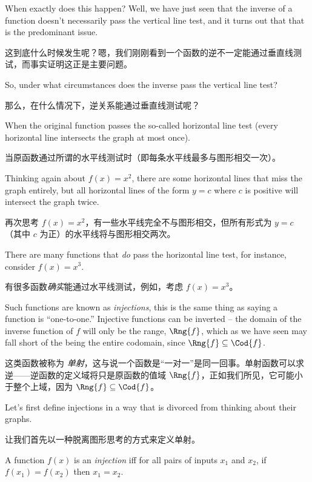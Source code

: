 When exactly does this happen?  Well, we have just seen that the inverse
of a function doesn't necessarily pass the vertical line test, and it turns
out that that is the predominant issue.

这到底什么时候发生呢？嗯，我们刚刚看到一个函数的逆不一定能通过垂直线测试，而事实证明这正是主要问题。

So, under what circumstances does
the inverse pass the vertical line test?

那么，在什么情况下，逆关系能通过垂直线测试呢？

When the original function 
passes the so-called horizontal line test (every horizontal line
intersects the graph at most once).

当原函数通过所谓的水平线测试时（即每条水平线最多与图形相交一次）。

Thinking again about $f(x)=x^2$, there
are some horizontal lines that miss the graph entirely, but all horizontal
lines of the form $y=c$ where $c$ is positive will intersect the graph twice.

再次思考 $f(x)=x^2$，有一些水平线完全不与图形相交，但所有形式为 $y=c$（其中 $c$ 为正）的水平线将与图形相交两次。

There are many functions that \emph{do} pass the horizontal line test, for 
instance, consider $f(x) = x^3$.

有很多函数\emph{确实}能通过水平线测试，例如，考虑 $f(x) = x^3$。

Such functions are known as 
\emph{injections}, this is the same thing as 
saying a function is ``one-to-one.''   Injective functions can be inverted --
the domain of the inverse function of $f$ will only be the range, $\Rng{f}$,
which as we have seen may fall short of the being the entire codomain, since 
$\Rng{f} \subseteq \Cod{f}$.

这类函数被称为 \emph{单射}，这与说一个函数是“一对一”是同一回事。单射函数可以求逆——逆函数的定义域将只是原函数的值域 $\Rng{f}$，正如我们所见，它可能小于整个上域，因为 $\Rng{f} \subseteq \Cod{f}$。

Let's first define injections in a way that is divorced from thinking
about their graphs.

让我们首先以一种脱离图形思考的方式来定义单射。

\begin{defi}
A function $f(x)$ is an \emph{injection} iff for all pairs of 
inputs $x_1$ and $x_2$, if $f(x_1) = f(x_2)$ then $x_1=x_2$.
\end{defi}

